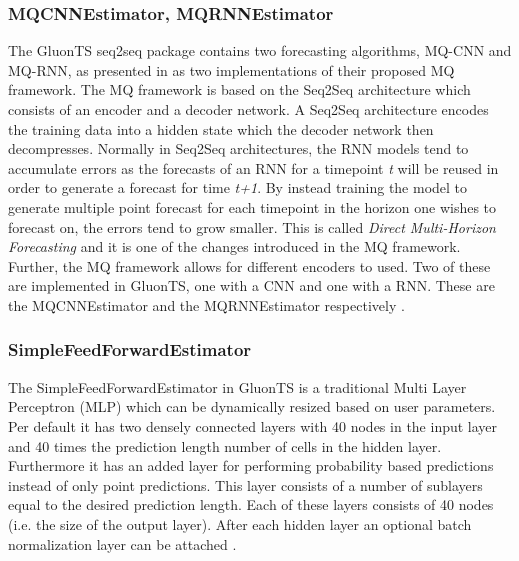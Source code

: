 \subsubsection{MQCNNEstimator, MQRNNEstimator}
The GluonTS seq2seq package contains two forecasting algorithms, MQ-CNN and MQ-RNN, as presented in \cite{wen_multi-horizon_2018} as two implementations of their proposed MQ framework. The MQ framework is based on the Seq2Seq architecture\cite{seq2seq} which consists of an encoder and a decoder network. A Seq2Seq architecture encodes the training data into a hidden state which the decoder network then decompresses. Normally in Seq2Seq architectures, the RNN models tend to accumulate errors as the forecasts of an RNN for a timepoint \textit{t} will be reused in order to generate a forecast for time \textit{t+1}. By instead training the model to generate multiple point forecast for each timepoint in the horizon one wishes to forecast on, the errors tend to grow smaller. This is called \textit{Direct Multi-Horizon Forecasting} and it is one of the changes introduced in the MQ framework. Further, the MQ framework allows for different encoders to used. Two of these are implemented in GluonTS, one with a CNN and one with a RNN. These are the MQCNNEstimator and the MQRNNEstimator respectively \cite{gluonts-website}.

\subsubsection{SimpleFeedForwardEstimator}
The SimpleFeedForwardEstimator in GluonTS is a traditional Multi Layer Perceptron (MLP) which can be dynamically resized based on user parameters. Per default it has two densely connected layers with 40 nodes in the input layer and 40 times the prediction length number of cells in the hidden layer. Furthermore it has an added layer for performing probability based predictions instead of only point predictions. This layer consists of a number of sublayers equal to the desired prediction length. Each of these layers consists of 40 nodes (i.e. the size of the output layer). After each hidden layer an optional batch normalization layer can be attached \cite{gluonts-github}.

